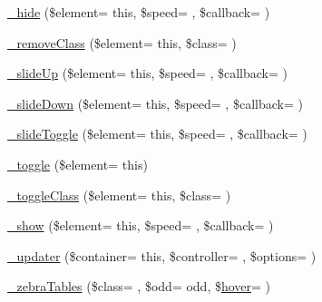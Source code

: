 \begin{DoxyCompactItemize}
\item 
\hyperlink{class_c_i___jquery_a91aa704c8ee42c85a8b00c8ada3cf6e1}{\+\_\+hide} (\$element= \textquotesingle{}this\textquotesingle{}, \$speed= \textquotesingle{}\textquotesingle{}, \$callback= \textquotesingle{}\textquotesingle{})
\item 
\hyperlink{class_c_i___jquery_ab000065fc81592859a299beb64c30f38}{\+\_\+remove\+Class} (\$element= \textquotesingle{}this\textquotesingle{}, \$class= \textquotesingle{}\textquotesingle{})
\item 
\hyperlink{class_c_i___jquery_a49a5d411e18779882275485c45592401}{\+\_\+slide\+Up} (\$element= \textquotesingle{}this\textquotesingle{}, \$speed= \textquotesingle{}\textquotesingle{}, \$callback= \textquotesingle{}\textquotesingle{})
\item 
\hyperlink{class_c_i___jquery_ad14a0700a81c5389643119cd37f4ada3}{\+\_\+slide\+Down} (\$element= \textquotesingle{}this\textquotesingle{}, \$speed= \textquotesingle{}\textquotesingle{}, \$callback= \textquotesingle{}\textquotesingle{})
\item 
\hyperlink{class_c_i___jquery_a04a1e624ff3e37151a87b048b40bb8e1}{\+\_\+slide\+Toggle} (\$element= \textquotesingle{}this\textquotesingle{}, \$speed= \textquotesingle{}\textquotesingle{}, \$callback= \textquotesingle{}\textquotesingle{})
\item 
\hyperlink{class_c_i___jquery_aafcbe892decebcbd0d13f4466f005f7a}{\+\_\+toggle} (\$element= \textquotesingle{}this\textquotesingle{})
\item 
\hyperlink{class_c_i___jquery_a7d23ab7e2d4723a28260a0f787aa7851}{\+\_\+toggle\+Class} (\$element= \textquotesingle{}this\textquotesingle{}, \$class= \textquotesingle{}\textquotesingle{})
\item 
\hyperlink{class_c_i___jquery_a631e07b830a14ee82ae2e5301a8dc59a}{\+\_\+show} (\$element= \textquotesingle{}this\textquotesingle{}, \$speed= \textquotesingle{}\textquotesingle{}, \$callback= \textquotesingle{}\textquotesingle{})
\item 
\hyperlink{class_c_i___jquery_a8ed979bca0ce41244c9a299db3e3b3fc}{\+\_\+updater} (\$container= \textquotesingle{}this\textquotesingle{}, \$controller= \textquotesingle{}\textquotesingle{}, \$options= \textquotesingle{}\textquotesingle{})
\item 
\hyperlink{class_c_i___jquery_a15c7aa190a2393ebd888da2a6a612f6c}{\+\_\+zebra\+Tables} (\$class= \textquotesingle{}\textquotesingle{}, \$odd= \textquotesingle{}odd\textquotesingle{}, \$\hyperlink{class_c_i___javascript_a8f4298c82e576b95f6e13d9c7ae2f3e0}{hover}= \textquotesingle{}\textquotesingle{})

\end{DoxyCompactItemize}
